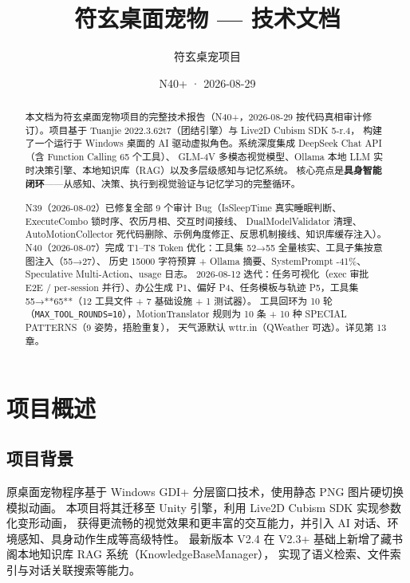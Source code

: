 \documentclass[12pt,a4paper]{ctexart}
\title{\vspace{-2cm}符玄桌面宠物 --- 技术文档}
\author{符玄桌宠项目}
\date{N40+ · 2026-08-29}
\begin{document}
\maketitle
\thispagestyle{empty}

\begin{abstract}
本文档为符玄桌面宠物项目的完整技术报告（N40+，2026-08-29 按代码真相审计修订）。项目基于 Tuanjie 2022.3.62t7（团结引擎）与 Live2D Cubism SDK 5-r.4，
构建了一个运行于 Windows 桌面的 AI 驱动虚拟角色。系统深度集成 DeepSeek Chat API（含 Function Calling 65 个工具）、
GLM-4V 多模态视觉模型、Ollama 本地 LLM 实时决策引擎、本地知识库（RAG）以及多层级感知与记忆系统。
核心亮点是\textbf{具身智能闭环}——从感知、决策、执行到视觉验证与记忆学习的完整循环。

N39（2026-08-02）已修复全部 9 个审计 Bug（IsSleepTime 真实睡眠判断、ExecuteCombo 锁时序、农历月相、交互时间接线、
DualModelValidator 清理、AutoMotionCollector 死代码删除、示例角度修正、反思机制接线、知识库缓存注入）。
N40（2026-08-07）完成 T1--T8 Token 优化：工具集 52→55 全量核实、工具子集按意图注入（55→27）、
历史 15000 字符预算 + Ollama 摘要、SystemPrompt -41\%、Speculative Multi-Action、usage 日志。
2026-08-12 迭代：任务可视化（exec 审批 E2E / per-session 并行）、办公生成 P1、偏好 P4、任务模板与轨迹 P5，工具集 55→**65**（12 工具文件 + 7 基础设施 + 1 测试器）。
工具回环为 10 轮（\texttt{MAX\_TOOL\_ROUNDS=10}），MotionTranslator 规则为 10 条 + 10 种 SPECIAL PATTERNS（9 姿势，捂脸重复），
天气源默认 wttr.in（QWeather 可选）。详见第 13 章。
\end{abstract}

\tableofcontents
\newpage

\section{项目概述}

\subsection{项目背景}

原桌面宠物程序基于 Windows GDI+ 分层窗口技术，使用静态 PNG 图片硬切换模拟动画。
本项目将其迁移至 Unity 引擎，利用 Live2D Cubism SDK 实现参数化变形动画，
获得更流畅的视觉效果和更丰富的交互能力，并引入 AI 对话、环境感知、具身动作生成等高级特性。
最新版本 V2.4 在 V2.3+ 基础上新增了藏书阁本地知识库 RAG 系统（KnowledgeBaseManager），
实现了语义检索、文件索引与对话关联搜索等能力。
\end{document}
